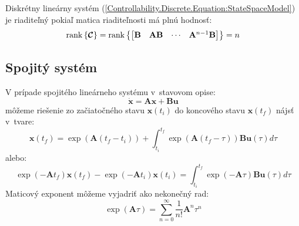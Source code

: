 \documentclass[a4paper, 10pt, ]{article}
\begin{document}
\begin{theorem}
    Diskrétny lineárny systém (\ref{Controllability.Discrete.Equation:StateSpaceModel}) je riaditeľný pokiaľ matica riaditeľnosti má plnú hodnosť:
    \begin{equation}
        \label{Controllability.Discrete.Equation:ControllabilityTheorem}
        \mathrm{rank} \left\{ \boldsymbol{\mathcal{C}} \right\} = 
        \mathrm{rank} \left\{
            \begin{bmatrix}
                \mathbf{B} & \mathbf{A} \mathbf{B} & \cdots & \mathbf{A}^{n - 1} \mathbf{B}
            \end{bmatrix}
        \right\} = 
        n
    \end{equation}
\end{theorem}



\subsection{Spojitý systém}

V prípade spojitého lineárneho systému v~stavovom opise:
\begin{equation}
    \label{Controllability.Continuous.Equation:StateSpaceModel}
    \dot{\bm{x}} = \bm{A} \bm{x} + \bm{B} \bm{u}
\end{equation}
môžeme riešenie zo začiatočného stavu $\bm{x}(t_i)$ do koncového stavu $\bm{x}(t_f)$ nájsť v~tvare:
\begin{equation}
    \label{Controllability.Continuous.Equation:StateSpaceModelSolution}
    \bm{x}(t_f) = \exp \left( \bm{A} (t_f - t_i) \right) + \int_{t_i}^{t_f} \exp(\bm{A} (t_f - \tau)) \bm{B} \bm{u}(\tau) d\tau
\end{equation}
alebo:
\begin{equation}
    \label{Controllability.Continuous.Equation:StateSpaceModelSolutionModified}
    \exp(-\bm{A} t_f) \bm{x}(t_f) - \exp(-\bm{A} t_i) \bm{x}(t_i) = \int_{t_i}^{t_f} \exp(-\bm{A} \tau) \bm{B} \bm{u}(\tau) d\tau
\end{equation}
Maticový exponent môžeme vyjadriť ako nekonečný rad:
\begin{equation}
    \label{Controllability.Continuous.Equation:MatrixExponent}
    \exp(\bm{A} \tau) = \sum_{n = 0}^{\infty} \frac{1}{n!} \bm{A}^{n} \tau^{n}
\end{equation}
\end{document}
